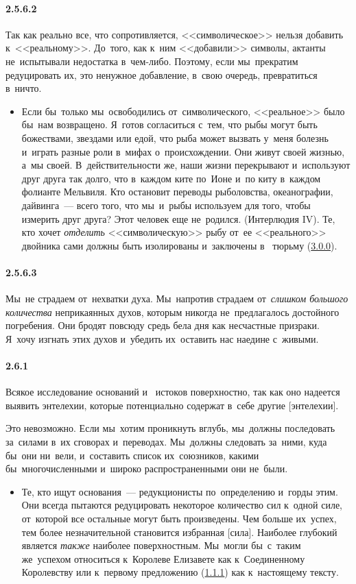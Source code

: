 \paragraph{2.5.6.2}\hypertarget{par:2.5.6.2}{} Так как реально все, что сопротивляется, <<символическое>> нельзя добавить к~<<реальному>>. До~того, как к~ним <<добавили>> символы, актанты не~испытывали недостатка в~чем-либо. Поэтому, если мы~прекратим редуцировать их, это ненужное добавление, в~свою очередь, превратиться в~ничто. 
	\begin{itemize}
	\item 
	Если бы~только мы~освободились от~символического, <<реальное>> было бы~нам возвращено. Я~готов согласиться с~тем, что рыбы могут быть божествами, звездами или едой, что рыба может вызвать у~меня болезнь и~играть разные роли в~мифах о~происхождении. Они живут своей жизнью, а~мы своей. В~действительности же, наши жизни перекрывают и~используют друг друга так долго, что в~каждом ките по~Ионе и~по киту в~каждом фолианте Мельвиля. Кто остановит переводы рыболовства, океанографии, дайвинга~--- всего того, что мы~и~рыбы используем для того, чтобы измерить друг друга? Этот человек еще не~родился. (Интерлюдия IV). Те, кто хочет {\itshape отделить} <<символическую>> рыбу от~ее <<реального>> двойника сами должны быть изолированы и~заключены в~ тюрьму (\hyperlink{par:3.0.0}{3.0.0}).
	\end{itemize}

\paragraph{2.5.6.3}\hypertarget{par:2.5.6.3}{} Мы~не страдаем от~нехватки духа. Мы~напротив страдаем от~{\itshape слишком большого количества} неприкаянных духов, которым никогда не~предлагалось достойного погребения. Они бродят повсюду средь бела дня как несчастные призраки. Я~хочу изгнать этих духов и~убедить их~оставить нас наедине с~живыми.

\paragraph{2.6.1}\hypertarget{par:2.6.1}{}\hypertarget{par:2.6.1}{Всякое исследование оснований и~ истоков поверхностно, так как оно надеется выявить энтелехии, которые потенциально содержат в~себе другие [энтелехии].} Это невозможно. Если мы~хотим проникнуть вглубь, мы~должны последовать за~силами в~их сговорах и~переводах. Мы~должны следовать за~ними, куда бы~они ни~вели, и~составить список их~союзников, какими бы~многочисленными и~широко распространенными они не~были. 
	\begin{itemize}
	\item 
	Те, кто ищут основания~--- редукционисты по~определению и~горды этим. Они всегда пытаются редуцировать некоторое количество сил к~одной силе, от~которой все остальные могут быть произведены. Чем больше их~успех, тем более незначительной становится избранная [сила]. Наиболее глубокий является {\itshape также} наиболее поверхностным. Мы~могли бы~с~таким же~успехом относиться к~Королеве Елизавете как к~Соединенному Королевству или к~первому предложению (\hyperlink{par:1.1.1}{1.1.1}) как к~настоящему тексту.
	\end{itemize}

